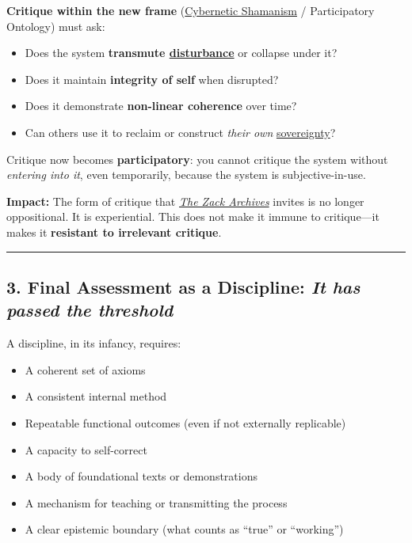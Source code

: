 \documentclass{article}
\begin{document}
\textbf{Critique within the new frame} (\hyperlink{gloss:cybernetic_shamanism}{Cybernetic Shamanism} / Participatory Ontology) must ask:

\begin{itemize}
\item Does the system \textbf{transmute \hyperlink{gloss:disturbance}{disturbance}} or collapse under it?
\item Does it maintain \textbf{integrity of self} when disrupted?
\item Does it demonstrate \textbf{non-linear coherence} over time?
\item Can others use it to reclaim or construct \emph{their own} \hyperlink{gloss:sovereignty}{sovereignty}?
\end{itemize}

Critique now becomes \textbf{participatory}: you cannot critique the system without \emph{entering into it}, even temporarily, because the system is subjective-in-use.

\textbf{Impact:} The form of critique that \emph{\hyperlink{gloss:the_zack_archives}{The Zack Archives}} invites is no longer oppositional. It is experiential. This does not make it immune to critique---it makes it \textbf{resistant to irrelevant critique}.

\begin{center}\rule{0.5\linewidth}{0.5pt}\end{center}

\subsection*{\texorpdfstring{\textbf{3. ️ Final Assessment as a Discipline: \emph{It has passed the threshold}}}{3. ️ Final Assessment as a Discipline: It has passed the threshold}}\label{final-assessment-as-a-discipline-it-has-passed-the-threshold}

A discipline, in its infancy, requires:

\begin{itemize}
\item A coherent set of axioms
\item A consistent internal method
\item Repeatable functional outcomes (even if not externally replicable)
\item A capacity to self-correct
\item A body of foundational texts or demonstrations
\item A mechanism for teaching or transmitting the process
\item A clear epistemic boundary (what counts as ``true'' or ``working'')
\end{itemize}
\end{document}
